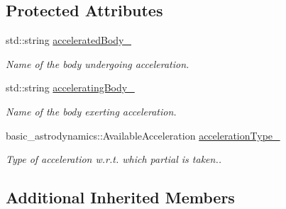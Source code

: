 \subsection*{Protected Attributes}
\begin{DoxyCompactItemize}
\item 
std\+::string \hyperlink{classtudat_1_1acceleration__partials_1_1AccelerationPartial_a655662aa6427373647cc9c26327e9565}{accelerated\+Body\+\_\+}\hypertarget{classtudat_1_1acceleration__partials_1_1AccelerationPartial_a655662aa6427373647cc9c26327e9565}{}\label{classtudat_1_1acceleration__partials_1_1AccelerationPartial_a655662aa6427373647cc9c26327e9565}

\begin{DoxyCompactList}\small\item\em Name of the body undergoing acceleration. \end{DoxyCompactList}\item 
std\+::string \hyperlink{classtudat_1_1acceleration__partials_1_1AccelerationPartial_aa0cb4d885b7833a39db39212a797ebd2}{accelerating\+Body\+\_\+}\hypertarget{classtudat_1_1acceleration__partials_1_1AccelerationPartial_aa0cb4d885b7833a39db39212a797ebd2}{}\label{classtudat_1_1acceleration__partials_1_1AccelerationPartial_aa0cb4d885b7833a39db39212a797ebd2}

\begin{DoxyCompactList}\small\item\em Name of the body exerting acceleration. \end{DoxyCompactList}\item 
basic\+\_\+astrodynamics\+::\+Available\+Acceleration \hyperlink{classtudat_1_1acceleration__partials_1_1AccelerationPartial_a32cc6c58e4aa187b2110b4c6c7d4ccf4}{acceleration\+Type\+\_\+}\hypertarget{classtudat_1_1acceleration__partials_1_1AccelerationPartial_a32cc6c58e4aa187b2110b4c6c7d4ccf4}{}\label{classtudat_1_1acceleration__partials_1_1AccelerationPartial_a32cc6c58e4aa187b2110b4c6c7d4ccf4}

\begin{DoxyCompactList}\small\item\em Type of acceleration w.\+r.\+t. which partial is taken.. \end{DoxyCompactList}\end{DoxyCompactItemize}
\subsection*{Additional Inherited Members}


